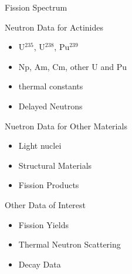 \documentclass[sans,mathserif,aspectratio=169, 10pt]{beamer}
\begin{document}
\begin{frame}{Fission Spectrum}
  \centering
\end{frame}

\begin{frame}{Neutron Data for Actinides}
\begin{itemize}
	\item<1> U$^{235}$, U$^{238}$, Pu$^{239}$
	\item<2> Np, Am, Cm, other U and Pu
	\item<3> thermal constants
	\item<4> Delayed Neutrons 
\end{itemize}
\end{frame}

\begin{frame}{Nuetron Data for Other Materials}
\begin{itemize}
	\item<1> Light nuclei
	\item<2> Structural Materials
	\item<3> Fission Products
\end{itemize}
\end{frame}

\begin{frame}{Other Data of Interest}
\begin{itemize}
  \item<1> Fission Yields
	\item<2> Thermal Neutron Scattering
	\item<3> Decay Data
\end{itemize}
\end{frame}
\end{document}
